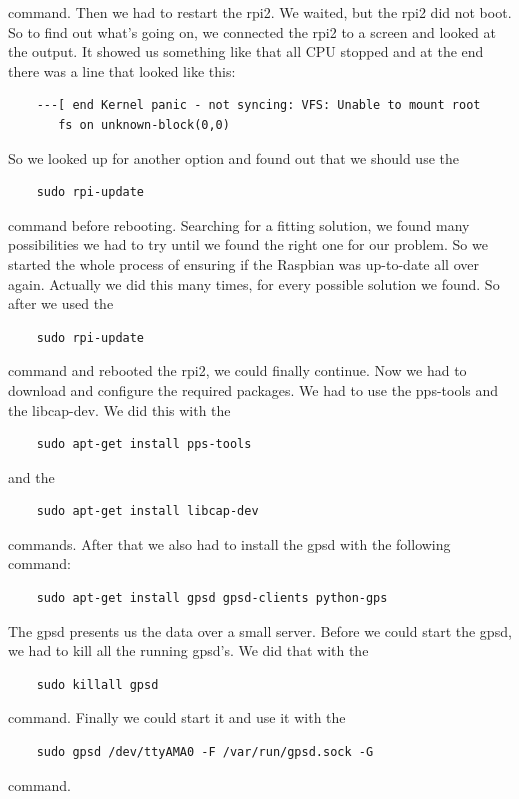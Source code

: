 command. Then we had to restart the \gls{rpi2}. We waited, but the \gls{rpi2} did not boot. So to find out what's going on, we connected the \gls{rpi2} to a screen and looked at the output. It showed us something like that all CPU stopped and at the end there was a line that looked like this:
\begin{verbatim}
	---[ end Kernel panic - not syncing: VFS: Unable to mount root 
	   fs on unknown-block(0,0)
\end{verbatim}
So we looked up for another option and found out that we should  use the 
\begin{verbatim}
	sudo rpi-update
\end{verbatim}
command before rebooting. Searching for a fitting solution, we found many possibilities we had to try until we found the right one for our problem. So we started the whole process of ensuring if the Raspbian was up-to-date all over again. Actually we did this many times, for every possible solution we found.\newline
So after we used the 
\begin{verbatim}
	sudo rpi-update
\end{verbatim} 
command and rebooted the \gls{rpi2}, we could finally continue.\newline
Now we had to download and configure the required packages. We had to use the pps-tools and the libcap-dev. We did this with the 
\begin{verbatim}
	sudo apt-get install pps-tools
\end{verbatim}
and the 
\begin{verbatim}
	sudo apt-get install libcap-dev
\end{verbatim}
commands.\newline
After that we also had to install the \gls{gpsd} with the following command:
\begin{verbatim}
	sudo apt-get install gpsd gpsd-clients python-gps
\end{verbatim}
The \gls{gpsd} presents us the data over a small server.\newline
Before we could start the \gls{gpsd}, we had to kill all the running \gls{gpsd}'s. We did that with the 
\begin{verbatim}
	sudo killall gpsd 
\end{verbatim}
command. Finally we could start it and use it with the 
\begin{verbatim}
	sudo gpsd /dev/ttyAMA0 -F /var/run/gpsd.sock -G
\end{verbatim}
command.
